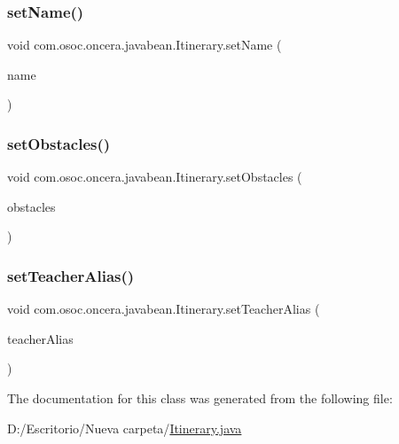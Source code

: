 \mbox{\label{classcom_1_1osoc_1_1oncera_1_1javabean_1_1_itinerary_abc5cc7036e4d8dc08814139d56926925}} 
\subsubsection{\texorpdfstring{setName()}{setName()}}
{\footnotesize\ttfamily void com.\+osoc.\+oncera.\+javabean.\+Itinerary.\+set\+Name (\begin{DoxyParamCaption}\item[{String}]{name }\end{DoxyParamCaption})}

\mbox{\label{classcom_1_1osoc_1_1oncera_1_1javabean_1_1_itinerary_a8f7d431455457502873ac8d74d6eb67c}} 
\subsubsection{\texorpdfstring{setObstacles()}{setObstacles()}}
{\footnotesize\ttfamily void com.\+osoc.\+oncera.\+javabean.\+Itinerary.\+set\+Obstacles (\begin{DoxyParamCaption}\item[{Array\+List$<$ \mbox{\hyperlink{classcom_1_1osoc_1_1oncera_1_1javabean_1_1_obstacles}{Obstacles}} $>$}]{obstacles }\end{DoxyParamCaption})}

\mbox{\label{classcom_1_1osoc_1_1oncera_1_1javabean_1_1_itinerary_a2196c734d56ebdc429cb19788f8f0c34}} 
\subsubsection{\texorpdfstring{setTeacherAlias()}{setTeacherAlias()}}
{\footnotesize\ttfamily void com.\+osoc.\+oncera.\+javabean.\+Itinerary.\+set\+Teacher\+Alias (\begin{DoxyParamCaption}\item[{String}]{teacher\+Alias }\end{DoxyParamCaption})}



The documentation for this class was generated from the following file\+:\begin{DoxyCompactItemize}
\item 
D\+:/\+Escritorio/\+Nueva carpeta/\mbox{\hyperlink{_itinerary_8java}{Itinerary.\+java}}\end{DoxyCompactItemize}
